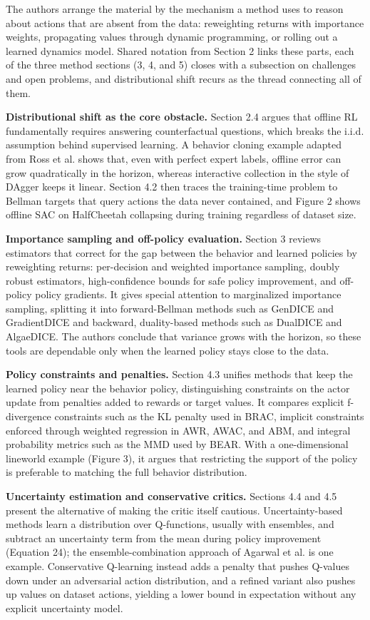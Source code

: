 \documentclass[11pt]{article}
\begin{document}
The authors arrange the material by the mechanism a method uses to reason about actions that are absent from the data: reweighting returns with importance weights, propagating values through dynamic programming, or rolling out a learned dynamics model. Shared notation from Section 2 links these parts, each of the three method sections (3, 4, and 5) closes with a subsection on challenges and open problems, and distributional shift recurs as the thread connecting all of them.

\textbf{Distributional shift as the core obstacle.} Section 2.4 argues that offline RL fundamentally requires answering counterfactual questions, which breaks the i.i.d. assumption behind supervised learning. A behavior cloning example adapted from Ross et al. shows that, even with perfect expert labels, offline error can grow quadratically in the horizon, whereas interactive collection in the style of DAgger keeps it linear. Section 4.2 then traces the training-time problem to Bellman targets that query actions the data never contained, and Figure 2 shows offline SAC on HalfCheetah collapsing during training regardless of dataset size.

\textbf{Importance sampling and off-policy evaluation.} Section 3 reviews estimators that correct for the gap between the behavior and learned policies by reweighting returns: per-decision and weighted importance sampling, doubly robust estimators, high-confidence bounds for safe policy improvement, and off-policy policy gradients. It gives special attention to marginalized importance sampling, splitting it into forward-Bellman methods such as GenDICE and GradientDICE and backward, duality-based methods such as DualDICE and AlgaeDICE. The authors conclude that variance grows with the horizon, so these tools are dependable only when the learned policy stays close to the data.

\textbf{Policy constraints and penalties.} Section 4.3 unifies methods that keep the learned policy near the behavior policy, distinguishing constraints on the actor update from penalties added to rewards or target values. It compares explicit f-divergence constraints such as the KL penalty used in BRAC, implicit constraints enforced through weighted regression in AWR, AWAC, and ABM, and integral probability metrics such as the MMD used by BEAR. With a one-dimensional lineworld example (Figure 3), it argues that restricting the support of the policy is preferable to matching the full behavior distribution.

\textbf{Uncertainty estimation and conservative critics.} Sections 4.4 and 4.5 present the alternative of making the critic itself cautious. Uncertainty-based methods learn a distribution over Q-functions, usually with ensembles, and subtract an uncertainty term from the mean during policy improvement (Equation 24); the ensemble-combination approach of Agarwal et al. is one example. Conservative Q-learning instead adds a penalty that pushes Q-values down under an adversarial action distribution, and a refined variant also pushes up values on dataset actions, yielding a lower bound in expectation without any explicit uncertainty model.
\end{document}
